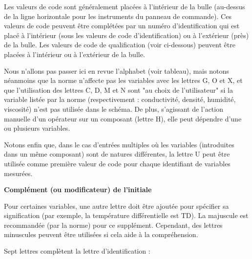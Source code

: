 Les valeurs de code sont généralement placées à l'intérieur de la bulle (au-dessus de la ligne horizontale pour les instruments du panneau de commande). 
Ces valeurs de code peuvent être complétées par un numéro d'identification qui est placé à l'intérieur (sous les valeurs de code d'identification) ou à l'extérieur (près) de la bulle. 
Les valeurs de code de qualification (voir ci-dessous) peuvent être placées à l'intérieur ou à l'extérieur de la bulle.
\vspace{0.3cm}

Nous n'allons pas passer ici en revue l'alphabet (voir tableau), mais notons néanmoins que la norme n'affecte pas les variables avec les lettres G, O et X, et que l'utilisation des lettres C, D, M et N sont "au choix de l'utilisateur" si la variable listée par la norme (respectivement : conductivité, densité, humidité, viscosité) n'est pas utilisée dans le schéma.
De plus, s'agissant de l'action manuelle d'un opérateur sur un composant (lettre H), elle peut dépendre d'une ou plusieurs variables.
\vspace{0.3cm}

Notons enfin que, dans le cas d'entrées multiples où les variables (introduites dans un même composant) sont de natures différentes, la lettre U peut être utilisée comme première valeur de code pour chaque identifiant de variables mesurées.
\vspace{0.3cm}

\textbf{Complément (ou modificateur) de l’initiale}
\vspace{0.3cm}

Pour certaines variables, une autre lettre doit être ajoutée pour spécifier sa signification (par exemple, la température différentielle est TD). La majuscule est recommandée (par la norme) pour ce supplément. Cependant, des lettres minuscules peuvent être utilisées si cela aide à la compréhension.
\vspace{0.3cm}

Sept lettres complètent la lettre d'identification :

